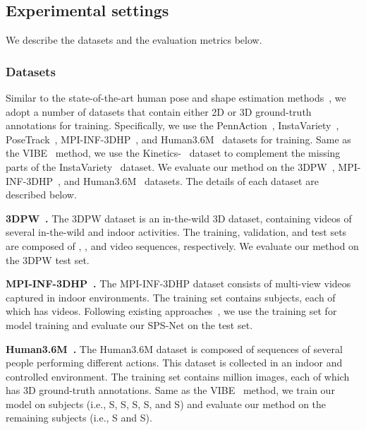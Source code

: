 \documentclass[times,referee,twocolumn,final,authoryear]{elsarticle}
\newcommand{\heading}[1]{\noindent\textbf{#1}}
\begin{document}
\vspace{-3.0mm} 
\subsection{Experimental settings}

We describe the datasets and the evaluation metrics below.

\vspace{-3.0mm}  
\subsubsection{Datasets}

Similar to the state-of-the-art human pose and shape estimation methods~\citep{HMR,TemporalHMR,SPIN,VIBE}, we adopt a number of datasets that contain either 2D or 3D ground-truth annotations for training.
Specifically, we use the PennAction~\citep{PennAction}, InstaVariety~\citep{TemporalHMR}, PoseTrack~\citep{PoseTrack}, MPI-INF-3DHP~\citep{MPII}, and Human3.6M~\citep{human36m} datasets for training.
Same as the VIBE~\citep{VIBE} method, we use the Kinetics-~\citep{kay2017kinetics} dataset to complement the missing parts of the InstaVariety~\citep{TemporalHMR} dataset.
We evaluate our method on the 3DPW~\citep{3DPW}, MPI-INF-3DHP~\citep{MPII}, and Human3.6M~\citep{human36m} datasets.
The details of each dataset are described below.

\heading{3DPW~\citep{3DPW}.}
The 3DPW dataset is an in-the-wild 3D dataset, containing  videos of several in-the-wild and indoor activities. 
The training, validation, and test sets are composed of , , and  video sequences, respectively.
We evaluate our method on the 3DPW test set.

\heading{MPI-INF-3DHP~\citep{MPII}.} 
The MPI-INF-3DHP dataset consists of multi-view videos captured in indoor environments.
The training set contains  subjects, each of which has  videos.
Following existing approaches~\citep{SPIN,VIBE}, we use the training set for model training and evaluate our SPS-Net on the test set.

\heading{Human3.6M~\citep{human36m}.}
The Human3.6M dataset is composed of  sequences of several people performing different actions.
This dataset is collected in an indoor and controlled environment.
The training set contains  million images, each of which has 3D ground-truth annotations.
Same as the VIBE~\citep{VIBE} method, we train our model on  subjects (i.e., S, S, S, S, and S) and evaluate our method on the remaining  subjects (i.e., S and S).
\end{document}
